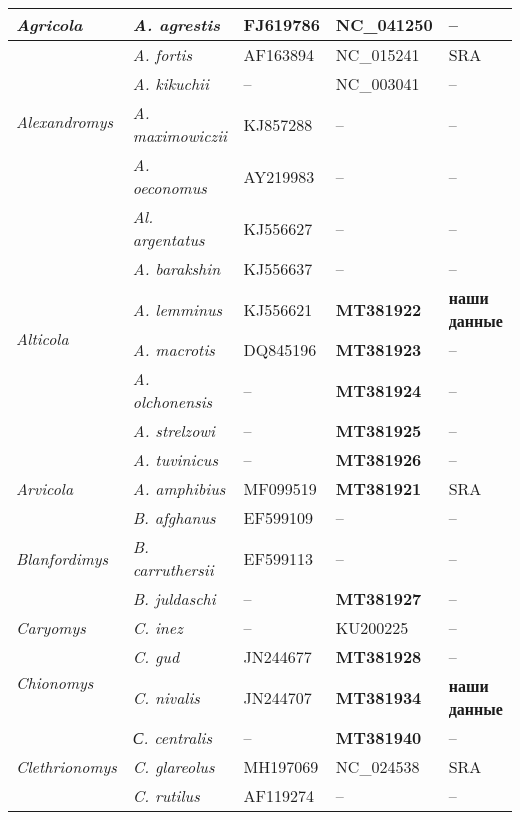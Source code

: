 \begin{landscape}
\begin{center}
\begin{longtable}{|p{3.5cm}|p{4.5cm}|p{4.0cm}|p{6.5cm}|p{4.5cm}|}
\hline \hline
\endlastfoot

\textit{Agricola} & \textit{A. agrestis}  & FJ619786 & NC\_041250 & --\\ \hline
\multirow{4}{*}{\textit{Alexandromys}} & \textit{A. fortis} & AF163894 & NC\_015241 & SRA\\ \cline{2-5}
& \textit{A. kikuchii} & -- & NC\_003041 & --\\ \cline{2-5}
& \textit{A. maximowiczii} & KJ857288 & -- & --\\ \cline{2-5}
& \textit{A. oeconomus} & AY219983 & -- & --\\ \hline
\multirow{7}{*}{\textit{Alticola}} & \textit{Al. argentatus} & KJ556627 & -- & --\\ \cline{2-5}
& \textit{A. barakshin} & KJ556637  & -- & --\\ \cline{2-5}
& \textit{A. lemminus} & KJ556621 & \textbf{MT381922} & \textbf{наши данные}\\ \cline{2-5}
& \textit{A. macrotis} & DQ845196 & \textbf{MT381923} & --\\ \cline{2-5}
& \textit{A. olchonensis} & -- & \textbf{MT381924} & --\\ \cline{2-5}
& \textit{A. strelzowi} & -- & \textbf{MT381925} & --\\ \cline{2-5}
& \textit{A. tuvinicus} & -- & \textbf{MT381926} & --\\ \hline
\textit{Arvicola} & \textit{A. amphibius} & MF099519  & \textbf{MT381921} & SRA\\ \hline
\multirow{3}{*}{\textit{Blanfordimys}} & \textit{B. afghanus} & EF599109 & -- & --\\ \cline{2-5}
& \textit{B. carruthersii} & EF599113 & -- & --\\ \cline{2-5}
& \textit{B. juldaschi} & -- & \textbf{MT381927} & --\\ \hline
\textit{Caryomys} & \textit{C. inez} & -- & KU200225 & --\\ \hline
\multirow{2}{*}{\textit{Chionomys}} & \textit{C. gud} & JN244677 & \textbf{MT381928} & --\\ \cline{2-5}
& \textit{C. nivalis} & JN244707 & \textbf{MT381934} & \textbf{наши данные}\\ \hline
\multirow{3}{*}{\textit{Clethrionomys}} & \textit{С. centralis} & -- & \textbf{MT381940} & --\\ \cline{2-5}
& \textit{C. glareolus} & MH197069 & NC\_024538 & SRA\\ \cline{2-5}
& \textit{C. rutilus} & AF119274 & -- & --\\ \hline

\end{longtable}
\end{center}
\end{landscape}

